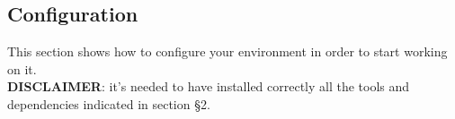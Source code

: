 \subsection{Configuration}
This section shows how to configure your environment in order to start working on it.\\
\textbf{DISCLAIMER}: it's needed to have installed correctly all the tools and dependencies indicated in section §2.




